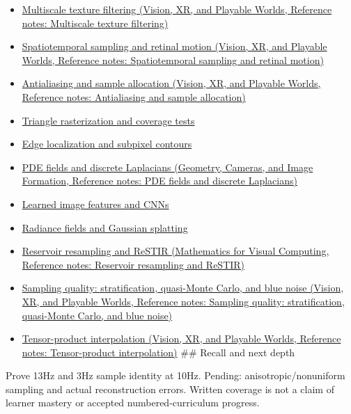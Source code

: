 \begin{itemize}
\item
  \href{../07-Vision-XR-and-Playable-Worlds/main.pdf\#nameddest=appendix-b677a85ba76f}{Multiscale texture filtering (Vision, XR, and Playable Worlds, Reference notes: Multiscale texture filtering)}
\item
  \href{../07-Vision-XR-and-Playable-Worlds/main.pdf\#nameddest=appendix-70895739febb}{Spatiotemporal sampling and retinal motion (Vision, XR, and Playable Worlds, Reference notes: Spatiotemporal sampling and retinal motion)}
\item
  \href{../07-Vision-XR-and-Playable-Worlds/main.pdf\#nameddest=appendix-4192b2bdd21e}{Antialiasing and sample allocation (Vision, XR, and Playable Worlds, Reference notes: Antialiasing and sample allocation)}
\item
  \hyperref[appendix-ed3f9bc298fe]{Triangle rasterization and coverage tests}
\item
  \hyperref[appendix-36022286b03e]{Edge localization and subpixel contours}
\item
  \href{../03-Geometry-Cameras-and-Image-Formation/main.pdf\#nameddest=appendix-1988d465c119}{PDE fields and discrete Laplacians (Geometry, Cameras, and Image Formation, Reference notes: PDE fields and discrete Laplacians)}
\item
  \hyperref[appendix-47c51ea026fb]{Learned image features and CNNs}
\item
  \hyperref[appendix-c5b332e400e7]{Radiance fields and Gaussian splatting}
\item
  \href{../02-Mathematics-for-Visual-Computing/main.pdf\#nameddest=appendix-68be451b78b1}{Reservoir resampling and ReSTIR (Mathematics for Visual Computing, Reference notes: Reservoir resampling and ReSTIR)}
\item
  \href{../07-Vision-XR-and-Playable-Worlds/main.pdf\#nameddest=appendix-9f693ffd82bc}{Sampling quality: stratification, quasi-Monte Carlo, and blue noise (Vision, XR, and Playable Worlds, Reference notes: Sampling quality: stratification, quasi-Monte Carlo, and blue noise)}
\item
  \href{../07-Vision-XR-and-Playable-Worlds/main.pdf\#nameddest=appendix-0a09b6dfdc86}{Tensor-product interpolation (Vision, XR, and Playable Worlds, Reference notes: Tensor-product interpolation)} \#\# Recall and next depth
\end{itemize}

Prove 13Hz and 3Hz sample identity at 10Hz. Pending: anisotropic/nonuniform sampling and actual reconstruction errors. Written coverage is not a claim of learner mastery or accepted numbered-curriculum progress.

